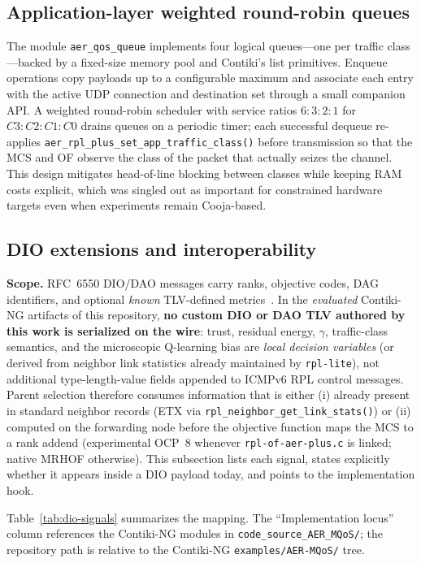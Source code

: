 \subsection{Application-layer weighted round-robin queues}
The module \texttt{aer\_qos\_queue} implements four logical queues---one per traffic class---backed by a fixed-size memory pool and Contiki's list primitives. Enqueue operations copy payloads up to a configurable maximum and associate each entry with the active UDP connection and destination set through a small companion API. A weighted round-robin scheduler with service ratios $6{:}3{:}2{:}1$ for $C3{:}C2{:}C1{:}C0$ drains queues on a periodic timer; each successful dequeue re-applies \texttt{aer\_rpl\_plus\_set\_app\_traffic\_class()} before transmission so that the MCS and OF observe the class of the packet that actually seizes the channel. This design mitigates head-of-line blocking between classes while keeping RAM costs explicit, which was singled out as important for constrained hardware targets even when experiments remain Cooja-based.

\subsection{DIO extensions and interoperability}
\label{sec:dio}
\textbf{Scope.} RFC~6550 DIO/DAO messages carry ranks, objective codes, DAG identifiers, and optional \emph{known} TLV-defined metrics~\cite{rfc6550,rfc6551}. In the \emph{evaluated} Contiki-NG artifacts of this repository, \textbf{no custom DIO or DAO TLV authored by this work is serialized on the wire}: trust, residual energy, $\gamma$, traffic-class semantics, and the microscopic Q-learning bias are \emph{local decision variables} (or derived from neighbor link statistics already maintained by \texttt{rpl-lite}), not additional type-length-value fields appended to ICMPv6 RPL control messages. Parent selection therefore consumes information that is either (i) already present in standard neighbor records (ETX via \texttt{rpl\_neighbor\_get\_link\_stats()}) or (ii) computed on the forwarding node before the objective function maps the MCS to a rank addend (experimental OCP~8 whenever \texttt{rpl-of-aer-plus.c} is linked; native MRHOF otherwise). This subsection lists each signal, states explicitly whether it appears inside a DIO payload today, and points to the implementation hook.

Table~\ref{tab:dio-signals} summarizes the mapping. The ``Implementation locus'' column references the Contiki-NG modules in \texttt{code\_source\_AER\_MQoS/}; the repository path is relative to the Contiki-NG \texttt{examples/AER-MQoS/} tree.

